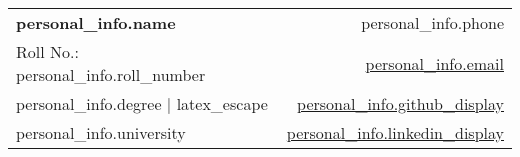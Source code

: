 \documentclass[a4paper,11pt]{article}
\begin{document}
\selectfont

{
\begin{tabularx}{\linewidth}{L r}
  \textbf{\Large {{ personal_info.name }}} & 
  {\raisebox{0.0\height}{\footnotesize \faPhone} {{ personal_info.phone }}} \\
  {Roll No.: {{ personal_info.roll_number }}} & 
  \href{mailto:{{ personal_info.email }}}{\raisebox{0.0\height}{\footnotesize \faEnvelope} {{ personal_info.email }}} \\
  {{ personal_info.degree | latex_escape }} & 
  \href{ {{ '{{' }} personal_info.github_url {{ '}}' }} }{\raisebox{0.0\height}{\footnotesize \faGithub} {{ personal_info.github_display }}} \\  
  {{ personal_info.university }} & 
  \href{ {{ '{{' }} personal_info.linkedin_url {{ '}}' }} }{\raisebox{0.0\height}{\footnotesize \faLinkedin} {{ personal_info.linkedin_display }}}
\end{tabularx}
}


\end{document}
